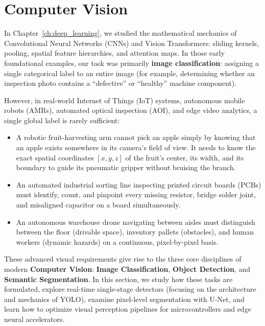 \section{Computer Vision}\label{sec:computer_vision}

In Chapter~\ref{ch:deep_learning}, we studied the mathematical mechanics of Convolutional Neural Networks (CNNs) and Vision Transformers: sliding kernels, pooling, spatial feature hierarchies, and attention maps. In those early foundational examples, our task was primarily \textbf{image classification}: assigning a single categorical label to an entire image (for example, determining whether an inspection photo contains a ``defective'' or ``healthy'' machine component).

However, in real-world Internet of Things (IoT) systems, autonomous mobile robots (AMRs), automated optical inspection (AOI), and edge video analytics, a single global label is rarely sufficient:
\begin{itemize}
    \item A robotic fruit-harvesting arm cannot pick an apple simply by knowing that an apple exists somewhere in its camera's field of view. It needs to know the exact spatial coordinates $[x, y, z]$ of the fruit's center, its width, and its boundary to guide its pneumatic gripper without bruising the branch.
    \item An automated industrial sorting line inspecting printed circuit boards (PCBs) must identify, count, and pinpoint every missing resistor, bridge solder joint, and misaligned capacitor on a board simultaneously.
    \item An autonomous warehouse drone navigating between aisles must distinguish between the floor (drivable space), inventory pallets (obstacles), and human workers (dynamic hazards) on a continuous, pixel-by-pixel basis.
\end{itemize}

These advanced visual requirements give rise to the three core disciplines of modern \textbf{Computer Vision}: \textbf{Image Classification}, \textbf{Object Detection}, and \textbf{Semantic Segmentation}. In this section, we study how these tasks are formulated, explore real-time single-stage detectors (focusing on the architecture and mechanics of YOLO), examine pixel-level segmentation with U-Net, and learn how to optimize visual perception pipelines for microcontrollers and edge neural accelerators.

